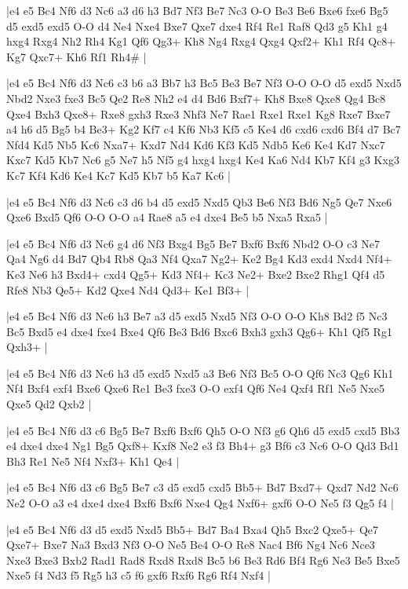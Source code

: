 \whitename{}
\blackname{}
\makegametitle
|e4 e5 Bc4 Nf6 d3 Nc6 a3 d6 h3 Bd7 Nf3 Be7 Nc3 O-O Be3 Be6 Bxe6 fxe6 Bg5 d5 exd5 exd5 O-O d4 Ne4 Nxe4 Bxe7 Qxe7 dxe4 Rf4 Re1 Raf8 Qd3 g5 Kh1 g4 hxg4 Rxg4 Nh2 Rh4 Kg1 Qf6 Qg3+ Kh8 Ng4 Rxg4 Qxg4 Qxf2+ Kh1 Rf4 Qc8+ Kg7 Qxc7+ Kh6 Rf1 Rh4\#  |

\whitename{}
\blackname{}
\makegametitle
|e4 e5 Bc4 Nf6 d3 Nc6 c3 b6 a3 Bb7 h3 Bc5 Be3 Be7 Nf3 O-O O-O d5 exd5 Nxd5 Nbd2 Nxe3 fxe3 Bc5 Qe2 Re8 Nh2 e4 d4 Bd6 Bxf7+ Kh8 Bxe8 Qxe8 Qg4 Bc8 Qxe4 Bxh3 Qxe8+ Rxe8 gxh3 Rxe3 Nhf3 Ne7 Rae1 Rxe1 Rxe1 Kg8 Rxe7 Bxe7 a4 h6 d5 Bg5 b4 Be3+ Kg2 Kf7 c4 Kf6 Nb3 Kf5 c5 Ke4 d6 cxd6 cxd6 Bf4 d7 Bc7 Nfd4 Kd5 Nb5 Kc6 Nxa7+ Kxd7 Nd4 Kd6 Kf3 Kd5 Ndb5 Ke6 Ke4 Kd7 Nxc7 Kxc7 Kd5 Kb7 Nc6 g5 Ne7 h5 Nf5 g4 hxg4 hxg4 Ke4 Ka6 Nd4 Kb7 Kf4 g3 Kxg3 Kc7 Kf4 Kd6 Ke4 Kc7 Kd5 Kb7 b5 Ka7 Kc6  |

\whitename{}
\blackname{}
\makegametitle
|e4 e5 Bc4 Nf6 d3 Nc6 c3 d6 b4 d5 exd5 Nxd5 Qb3 Be6 Nf3 Bd6 Ng5 Qe7 Nxe6 Qxe6 Bxd5 Qf6 O-O O-O a4 Rae8 a5 e4 dxe4 Be5 b5 Nxa5 Rxa5  |

\whitename{}
\blackname{}
\makegametitle
|e4 e5 Bc4 Nf6 d3 Nc6 g4 d6 Nf3 Bxg4 Bg5 Be7 Bxf6 Bxf6 Nbd2 O-O c3 Ne7 Qa4 Ng6 d4 Bd7 Qb4 Rb8 Qa3 Nf4 Qxa7 Ng2+ Ke2 Bg4 Kd3 exd4 Nxd4 Nf4+ Ke3 Ne6 h3 Bxd4+ cxd4 Qg5+ Kd3 Nf4+ Kc3 Ne2+ Bxe2 Bxe2 Rhg1 Qf4 d5 Rfe8 Nb3 Qe5+ Kd2 Qxe4 Nd4 Qd3+ Ke1 Bf3+  |

\whitename{}
\blackname{}
\makegametitle
|e4 e5 Bc4 Nf6 d3 Nc6 h3 Be7 a3 d5 exd5 Nxd5 Nf3 O-O O-O Kh8 Bd2 f5 Nc3 Bc5 Bxd5 e4 dxe4 fxe4 Bxe4 Qf6 Be3 Bd6 Bxc6 Bxh3 gxh3 Qg6+ Kh1 Qf5 Rg1 Qxh3+  |

\whitename{}
\blackname{}
\makegametitle
|e4 e5 Bc4 Nf6 d3 Nc6 h3 d5 exd5 Nxd5 a3 Be6 Nf3 Bc5 O-O Qf6 Nc3 Qg6 Kh1 Nf4 Bxf4 exf4 Bxe6 Qxe6 Re1 Be3 fxe3 O-O exf4 Qf6 Ne4 Qxf4 Rf1 Ne5 Nxe5 Qxe5 Qd2 Qxb2  |

\whitename{}
\blackname{}
\makegametitle
|e4 e5 Bc4 Nf6 d3 c6 Bg5 Be7 Bxf6 Bxf6 Qh5 O-O Nf3 g6 Qh6 d5 exd5 cxd5 Bb3 e4 dxe4 dxe4 Ng1 Bg5 Qxf8+ Kxf8 Ne2 e3 f3 Bh4+ g3 Bf6 c3 Nc6 O-O Qd3 Bd1 Bh3 Re1 Ne5 Nf4 Nxf3+ Kh1 Qe4  |

\whitename{}
\blackname{}
\makegametitle
|e4 e5 Bc4 Nf6 d3 c6 Bg5 Be7 c3 d5 exd5 cxd5 Bb5+ Bd7 Bxd7+ Qxd7 Nd2 Nc6 Ne2 O-O a3 e4 dxe4 dxe4 Bxf6 Bxf6 Nxe4 Qg4 Nxf6+ gxf6 O-O Ne5 f3 Qg5 f4  |

\whitename{}
\blackname{}
\makegametitle
|e4 e5 Bc4 Nf6 d3 d5 exd5 Nxd5 Bb5+ Bd7 Ba4 Bxa4 Qh5 Bxc2 Qxe5+ Qe7 Qxe7+ Bxe7 Na3 Bxd3 Nf3 O-O Ne5 Be4 O-O Re8 Nac4 Bf6 Ng4 Nc6 Nce3 Nxe3 Bxe3 Bxb2 Rad1 Rad8 Rxd8 Rxd8 Bc5 b6 Be3 Rd6 Bf4 Rg6 Ne3 Be5 Bxe5 Nxe5 f4 Nd3 f5 Rg5 h3 c5 f6 gxf6 Rxf6 Rg6 Rf4 Nxf4  |

